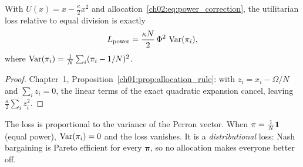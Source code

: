 \documentclass[../structural_economics_book.tex]{subfiles}
\begin{document}
\begin{proposition}\label{ch02:prop:power_loss}
With $U(x) = x - \frac{\kappa}{2}x^2$ and allocation~\eqref{ch02:eq:power_correction}, the utilitarian loss relative to equal division is exactly
\begin{equation}\label{ch02:eq:power_loss}
L_{\text{power}} = \frac{\kappa N}{2}\,\Phi^2\,\operatorname{Var}(\pi_i),
\end{equation}
where $\operatorname{Var}(\pi_i) = \frac{1}{N}\sum_i (\pi_i - 1/N)^2$.
\end{proposition}

\begin{proof}
Chapter~1, Proposition~\ref{ch01:prop:allocation_rule}: with $z_i = x_i - \Omega/N$ and $\sum_i z_i = 0$, the linear terms of the exact quadratic expansion cancel, leaving $\frac{\kappa}{2}\sum_i z_i^2$.
\end{proof}

The loss is proportional to the variance of the Perron vector. When $\pi = \frac{1}{N}\mathbf{1}$ (equal power), $\operatorname{Var}(\pi_i) = 0$ and the loss vanishes. It is a \textit{distributional} loss: Nash bargaining is Pareto efficient for every $\boldsymbol{\pi}$, so no allocation makes everyone better off.
\end{document}
